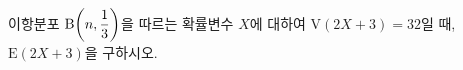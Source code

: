이항분포 $\mathrm{B}\!\left(n{,}\mkern3mu\mathopen{}\dfrac{1}{3}\right)$을 따르는 확률변수 $X$에 대하여 $\mathrm{V}(2X+3)=32$일 때, $\mathrm{E}(2X+3)$을 구하시오.
